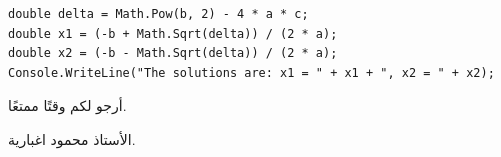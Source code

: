 \documentclass[14pt]{extarticle}
\begin{document}
\begin{enumerate}[itemsep=3em]
\begin{boxSolution}
\begin{english}
\begin{verbatim}
double delta = Math.Pow(b, 2) - 4 * a * c;
double x1 = (-b + Math.Sqrt(delta)) / (2 * a);
double x2 = (-b - Math.Sqrt(delta)) / (2 * a);
Console.WriteLine("The solutions are: x1 = " + x1 + ", x2 = " + x2);
            \end{verbatim}
        \end{english}
    \end{boxSolution}
    \fi
    \fi

\end{enumerate}


\vspace{1cm}
\begin{flushleft}
أرجو لكم وقتًا ممتعًا.

الأستاذ محمود اغبارية.
\end{flushleft}
\end{document}
